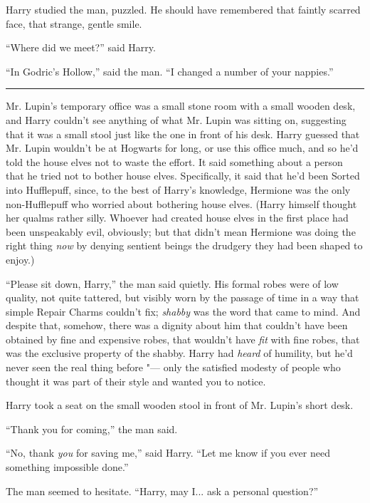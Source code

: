 Harry studied the man, puzzled. He should have remembered that faintly
scarred face, that strange, gentle smile.

``Where did we meet?'' said Harry.

``In Godric's Hollow,'' said the man. ``I changed a number of your
nappies.''

\begin{center}\rule{3in}{0.4pt}\end{center}

Mr. Lupin's temporary office was a small stone room with a small wooden
desk, and Harry couldn't see anything of what Mr. Lupin was sitting on,
suggesting that it was a small stool just like the one in front of his
desk. Harry guessed that Mr. Lupin wouldn't be at Hogwarts for long, or
use this office much, and so he'd told the house elves not to waste the
effort. It said something about a person that he tried not to bother
house elves. Specifically, it said that he'd been Sorted into
Hufflepuff, since, to the best of Harry's knowledge, Hermione was the
only non-Hufflepuff who worried about bothering house elves. (Harry
himself thought her qualms rather silly. Whoever had created house elves
in the first place had been unspeakably evil, obviously; but that didn't
mean Hermione was doing the right thing \emph{now} by denying sentient
beings the drudgery they had been shaped to enjoy.)

``Please sit down, Harry,'' the man said quietly. His formal robes were
of low quality, not quite tattered, but visibly worn by the passage of
time in a way that simple Repair Charms couldn't fix; \emph{shabby} was
the word that came to mind. And despite that, somehow, there was a
dignity about him that couldn't have been obtained by fine and expensive
robes, that wouldn't have \emph{fit} with fine robes, that was the
exclusive property of the shabby. Harry had \emph{heard} of humility,
but he'd never seen the real thing before "--- only the satisfied modesty
of people who thought it was part of their style and wanted you to
notice.

Harry took a seat on the small wooden stool in front of Mr. Lupin's
short desk.

``Thank you for coming,'' the man said.

``No, thank \emph{you} for saving me,'' said Harry. ``Let me know if you
ever need something impossible done.''

The man seemed to hesitate. ``Harry, may I... ask a personal
question?''

